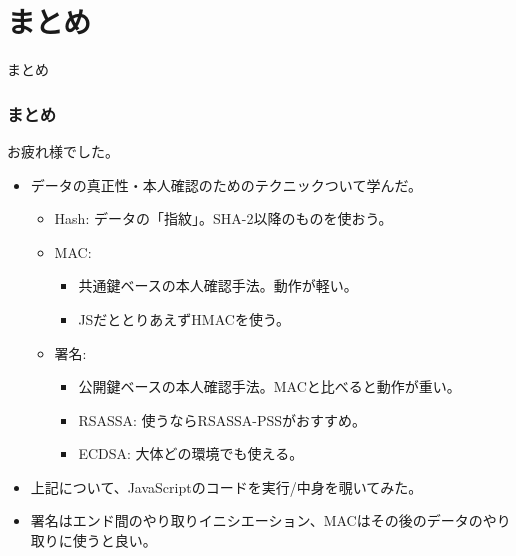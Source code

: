 \documentclass[12pt,dvipdfmx]{beamer}
\newcommand{\backupbegin}{
   \newcounter{framenumberappendix}
   \setcounter{framenumberappendix}{\value{framenumber}}
}
\newcommand{\backupend}{
   \addtocounter{framenumberappendix}{-\value{framenumber}}
   \addtocounter{framenumber}{\value{framenumberappendix}} 
}
\begin{document}
\section{まとめ}
\begin{frame}
 \centering
 {\Large まとめ}
\end{frame}

\begin{frame}
\frametitle{まとめ}
お疲れ様でした。

\begin{itemize}
\item データの真正性・本人確認のためのテクニックついて学んだ。
\begin{itemize}
 \item Hash: データの「指紋」。SHA-2以降のものを使おう。
 \item MAC:
\begin{itemize}
 \item 共通鍵ベースの本人確認手法。動作が軽い。
 \item JSだととりあえずHMACを使う。
\end{itemize}
 \item 署名:
\begin{itemize}
\item 公開鍵ベースの本人確認手法。MACと比べると動作が重い。
\item RSASSA: 使うなら\alert{RSASSA-PSSがおすすめ}。
\item ECDSA: 大体どの環境でも使える。
\end{itemize}
\end{itemize}
\item 上記について、JavaScriptのコードを実行/中身を覗いてみた。
\item 署名はエンド間のやり取りイニシエーション、MACはその後のデータのやり取りに使うと良い。
\end{itemize}
\end{frame}














 

\end{document}
